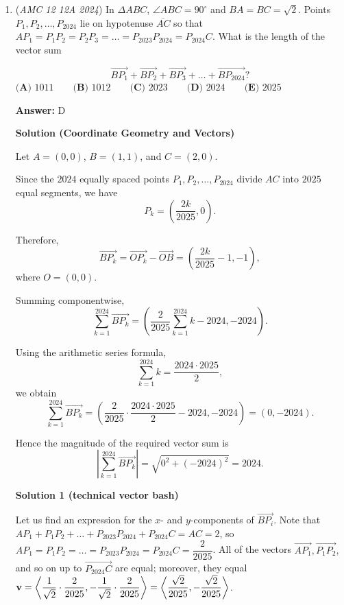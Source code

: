 \begin{enumerate}
	\item (\textit{AMC 12 12A 2024}) In $\Delta ABC$, $\angle ABC = 90^\circ$ and $BA = BC = \sqrt{2}$. Points $P_1, P_2, \dots, P_{2024}$ lie on hypotenuse $\overline{AC}$ so that $AP_1= P_1P_2 = P_2P_3 = \dots = P_{2023}P_{2024} = P_{2024}C$. What is the length of the vector sum

 \[\overrightarrow{BP_1} + \overrightarrow{BP_2} + \overrightarrow{BP_3} + \dots + \overrightarrow{BP_{2024}}?\]
$\textbf{(A) }1011 \qquad \textbf{(B) }1012 \qquad \textbf{(C) }2023 \qquad \textbf{(D) }2024 \qquad \textbf{(E) }2025 \qquad$

 \textbf{Answer: }D



\textbf{Solution (Coordinate Geometry and Vectors)}

Let $A=(0,0)$, $B=(1,1)$, and $C=(2,0)$.

 Since the $2024$ equally spaced points $P_1,P_2,\ldots,P_{2024}$ divide $AC$ into $2025$ equal segments, we have
 \[P_k=\left(\frac{2k}{2025},0\right).\]

 Therefore,
 \[\overrightarrow{BP_k} =\overrightarrow{OP_k}-\overrightarrow{OB} =\left(\frac{2k}{2025}-1,-1\right),\]where $O=(0,0)$.

 Summing componentwise,
 \[\sum_{k=1}^{2024}\overrightarrow{BP_k} =\left(\frac{2}{2025}\sum_{k=1}^{2024}k-2024,-2024\right).\]

 Using the arithmetic series formula,
 \[\sum_{k=1}^{2024}k=\frac{2024\cdot2025}{2},\]we obtain
 \[\sum_{k=1}^{2024}\overrightarrow{BP_k} =\left(\frac{2}{2025}\cdot\frac{2024\cdot2025}{2}-2024,-2024\right) =(0,-2024).\]

 Hence the magnitude of the required vector sum is
 \[\left|\sum_{k=1}^{2024}\overrightarrow{BP_k}\right| =\sqrt{0^2+(-2024)^2} =\boxed{2024}.\]




\textbf{Solution 1 (technical vector bash)}

Let us find an expression for the $x$- and $y$-components of $\overrightarrow{BP_i}$. Note that $AP_1+P_1P_2+\dots+P_{2023}P_{2024}+P_{2024}C=AC=2$, so $AP_1=P_1P_2=\dots=P_{2023}P_{2024}=P_{2024}C=\dfrac2{2025}$. All of the vectors $\overrightarrow{AP_1},\overrightarrow{P_1P_2},$ and so on up to $\overrightarrow{P_{2024}C}$ are equal; moreover, they equal $\textbf v=\left\langle\dfrac1{\sqrt2}\cdot\dfrac2{2025},-\dfrac1{\sqrt2}\cdot\dfrac2{2025}\right\rangle=\left\langle\dfrac{\sqrt2}{2025},-\dfrac{\sqrt2}{2025}\right\rangle$. 


\end{enumerate}
